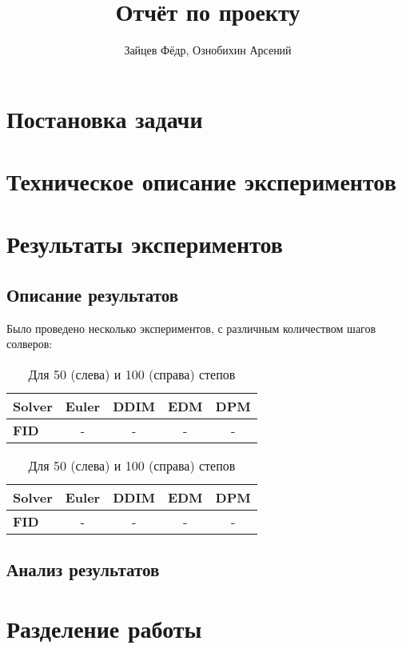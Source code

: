 \documentclass[a4paper]{article}
\title{Отчёт по проекту}
\author{Зайцев Фёдр, Ознобихин Арсений}
\begin{document}
    \maketitle{}
    \tableofcontents
    \newpage

    \section{Постановка задачи}



    \section{Техническое описание экспериментов}



    \section{Результаты экспериментов}
    \subsection{Описание результатов}
    Было проведено несколько экспериментов, с различным количеством шагов солверов:
    \begin{table}
        \begin{tabular}{ l | c | c | c | c }
            \textbf{Solver} & Euler & DDIM  & EDM   & DPM \\ \hline
            \textbf{FID}    & -     & -     &   -   & -
        \end{tabular}\hspace{50pt}%
        \begin{tabular}{ l | c | c | c | c }
            \textbf{Solver} & Euler & DDIM  & EDM   & DPM \\ \hline
            \textbf{FID}    & -     & -     &   -   & -
        \end{tabular}
        \caption{Для 50 (слева) и 100 (справа) степов}
    \end{table}

    \subsection{Анализ результатов}



    \section{Разделение работы}
\end{document}

